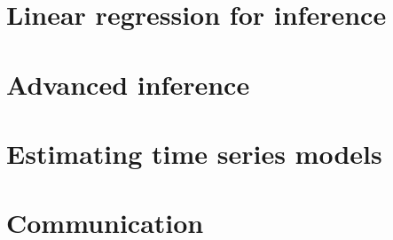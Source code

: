 \documentclass[oneside]{book}
\begin{document}
\part{Linear regression for inference}






\part{Advanced inference}







\part{Estimating time series models}











\part{Communication}





\end{document}
